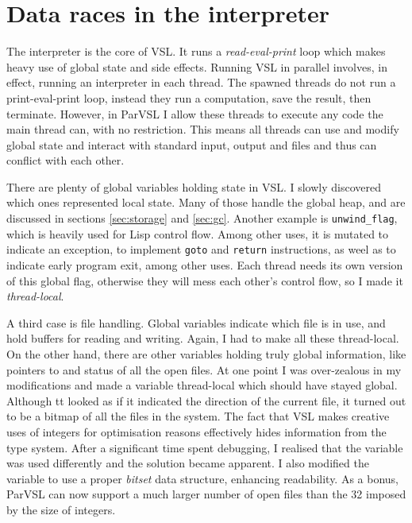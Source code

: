 \section{Data races in the interpreter}
\label{sec:datarace}

The interpreter is the core of VSL. It runs a \emph{read-eval-print} loop which makes heavy
use of global state and side effects.
Running VSL in parallel involves, in effect, running an interpreter in each thread. The spawned threads do not
run a print-eval-print loop, instead they run a computation, save the result, then terminate. However,
in ParVSL I allow these threads to execute any code the main thread can, with no restriction. This means
all threads can use and modify global state and interact with standard input, output and files and
thus can conflict with each other.


There are plenty of global variables holding state in VSL. I slowly discovered which ones represented local
state. Many of those handle the global heap, and are discussed in sections \ref{sec:storage} and \ref{sec:gc}.
Another example is \verb|unwind_flag|, which is heavily used for Lisp control flow. Among other uses, it is
mutated to indicate an exception, to implement \verb|goto| and \verb|return| instructions,
as weel as to indicate early program exit,
among other uses. Each thread needs its own version of this global flag, otherwise they will mess each
other's control flow, so I made it \emph{thread-local}.

A third case is file handling. Global variables indicate which file is in use, and hold buffers for reading
and writing. Again, I had to make all these thread-local. On the other hand, there are other variables holding
truly global information, like pointers to and status of all the open files. At one point I was over-zealous in
my modifications and made a variable thread-local which should have stayed global. Although tt looked as if it indicated
the direction of the current file, it turned out to be a bitmap of all the files in the system. The fact
that VSL makes creative uses of integers for optimisation reasons effectively hides information from the type system.
After a significant time spent debugging, I realised that the variable was used differently and the solution became apparent.
I also modified the variable to use a proper \emph{bitset} data structure, enhancing readability.
As a bonus, ParVSL can now support a much larger number of open files than the 32 imposed by the size of integers.

